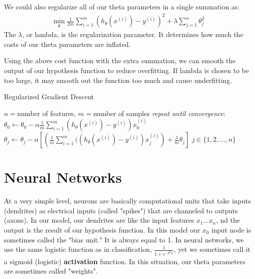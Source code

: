 \documentclass{article}
\begin{document}
            We could also regularize all of our theta parameters in a single summation as:
            \begin{align*}
                \min_{\theta}\frac{1}{2m}\sum_{i=1}^m(h_{\theta}(x^{(i)})-y^{(i)})^2 + \lambda\sum_{j=1}^{n}\theta_j^2        
            \end{align*}
            The $\lambda$, or lambda, is the regularization parameter. It determines how much the costs of our theta parameters are inflated.

            Using the above cost function with the extra summation, we can smooth the output of our hypothesis function to reduce overfitting. If lambda is chosen 
            to be too large, it may smooth out the function too much and cause underfitting.

            \begin{algorithm}
                \caption{Regularized Gradient Descent}
                \begin{algorithmic}
                    \STATE $n = $number of features, $m = $number of samples
                    \STATE \emph{repeat until convergence}:
                    \STATE \hspace{12pt}$\theta_0 \gets \theta_0 - \alpha\frac{1}{m}\sum_{i=1}^{m}(h_{\theta}(x^{(i)})-y^{(i)})x_0^{(i)}$
                    \STATE \hspace{12pt}$\theta_j \gets \theta_j - \alpha\left[\left(\frac{1}{m}\sum_{i=1}^{m}((h_{\theta}(x^{(i)})-y^{(i)})x_j^{(i)}\right) + \frac{\lambda}{m}\theta_j\right]$ \qquad $j \in \{1,2,\ldots,n\}$
                \end{algorithmic}
            \end{algorithm}    

    \section{Neural Networks}

        At a very simple level, neurons are basically computational units that take inputs 
        (dendrites) as electrical inputs (called "spikes") that are channeled to outputs (axons). In our model, 
        our dendrites are like the input features $x_1 \ldots x_n$, nd the output is the result of our hypothesis function. In this model our $x_0$
        input node is sometimes called the "bias unit." It is always equal to 1. In neural networks, 
        we use the same logistic function as in classification, $\frac{1}{1+e^{-\theta^Tx}}$, yet we sometimes call it a sigmoid (logistic)
        \textbf{activation} function. In this situation, our theta parameters are sometimes called "weights".
\end{document}

